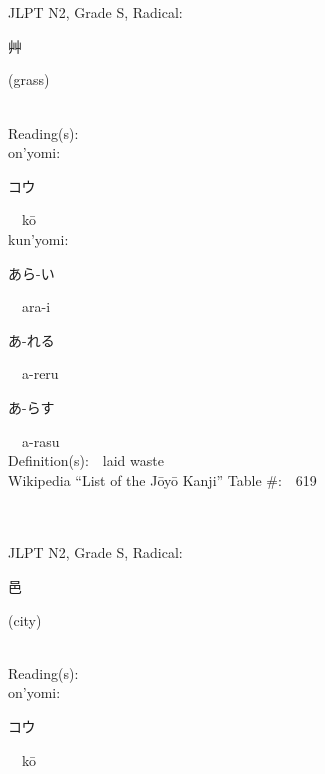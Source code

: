 \begin{multicols}{2}
\ \ \\
{\fontsize{34pt}{40pt}  }\ \ \\  %
{JLPT N2, Grade S, Radical:\ \ {\begin{CJK}{UTF8}{min} 艸 \end{CJK}} (grass) } \\
Reading(s):\ \ \\
{\hspace*{1em}}on'yomi:\ \ \\
{\hspace*{2em}}{\begin{CJK}{UTF8}{min} コウ \end{CJK}}\ \ k\=o\ \ \\
{\hspace*{1em}}kun'yomi:\ \ \\
{\hspace*{2em}}{\begin{CJK}{UTF8}{min} あら-い \end{CJK}}\ \ ara-i\ \ \\
{\hspace*{2em}}{\begin{CJK}{UTF8}{min} あ-れる \end{CJK}}\ \ a-reru\ \ \\
{\hspace*{2em}}{\begin{CJK}{UTF8}{min} あ-らす \end{CJK}}\ \ a-rasu\ \ \\
Definition(s):\ \ laid waste \\
Wikipedia ``List of the J\=oy\=o Kanji'' Table \#:\ \ 619 \\
\ \ \\
{\fontsize{34pt}{40pt}  }\ \ \\  %
{JLPT N2, Grade S, Radical:\ \ {\begin{CJK}{UTF8}{min} 邑 \end{CJK}} (city) } \\
Reading(s):\ \ \\
{\hspace*{1em}}on'yomi:\ \ \\
{\hspace*{2em}}{\begin{CJK}{UTF8}{min} コウ \end{CJK}}\ \ k\=o\ \ \\

\end{multicols}

